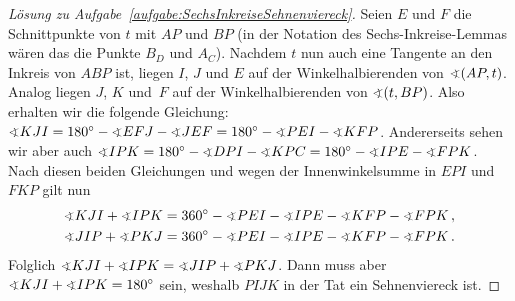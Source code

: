 \begin{proof}[Lösung zu Aufgabe~\ref{aufgabe:SechsInkreiseSehnenviereck}]
	Seien $E$ und $F$ die Schnittpunkte von $t$ mit $AP$ und $BP$ (in der Notation des Sechs-Inkreise-Lemmas wären das die Punkte $B_D$ und $A_C$). Nachdem $t$ nun auch eine Tangente an den Inkreis von $ABP$ ist, liegen $I$, $J$ und $E$ auf der Winkelhalbierenden von $\winkel(AP,t)$. Analog liegen $J$, $K$ und~$F$ auf der Winkelhalbierenden von $\winkel(t,BP)$. Also erhalten wir die folgende Gleichung: $\winkel KJI=180^\circ-\winkel EFJ-\winkel JEF=180^\circ-\winkel PEI-\winkel KFP$. Andererseits sehen wir aber auch $\winkel IPK=180^\circ-\winkel DPI-\winkel KPC=180^\circ-\winkel IPE-\winkel FPK$. Nach diesen beiden Gleichungen und wegen der Innenwinkelsumme in $EPI$ und $FKP$ gilt nun
	\begin{align*}
		\winkel KJI+\winkel IPK&=360^\circ-\winkel PEI-\winkel IPE-\winkel KFP-\winkel FPK\,,\\
		\winkel JIP+\winkel PKJ&=360^\circ-\winkel PEI-\winkel IPE-\winkel KFP-\winkel FPK\,.
	\end{align*}
	Folglich $\winkel KJI+\winkel IPK=\winkel JIP+\winkel PKJ$. Dann muss aber $\winkel KJI+\winkel IPK=180^\circ$ sein, weshalb $PIJK$ in der Tat ein Sehnenviereck ist.
\end{proof}

